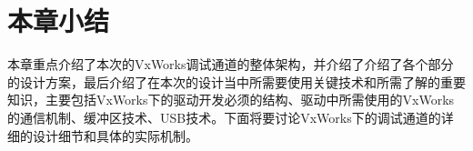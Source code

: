 	

\section{本章小结}
	本章重点介绍了本次的VxWorks调试通道的整体架构，并介绍了介绍了各个部分的设计方案，最后介绍了在本次的设计当中所需要使用关键技术和所需了解的重要知识，主要包括VxWorks下的驱动开发必须的结构、驱动中所需使用的VxWorks的通信机制、缓冲区技术、USB技术。下面将要讨论VxWorks下的调试通道的详细的设计细节和具体的实际机制。

























